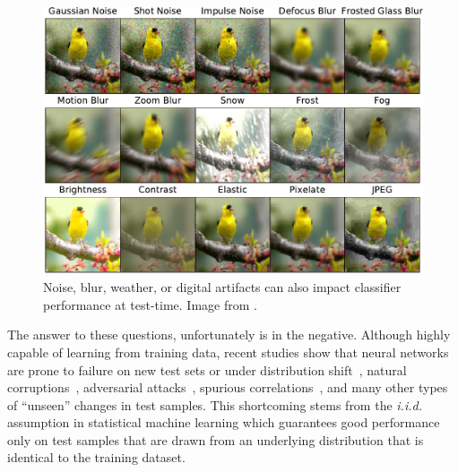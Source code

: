 \begin{figure}
    \centering
    \includegraphics[width=\linewidth]{figures/distorted.pdf}
    \caption{
    Noise, blur, weather, or digital artifacts can also impact classifier performance at test-time.
    Image from \citet{hendrycks2018benchmarking}.
    }
    \label{fig:cifar_c_introduction}
\end{figure}
The answer to these questions, unfortunately is in the negative.
Although highly capable of learning from training data, recent studies show that neural networks are prone to failure on new test sets or under distribution shift~\citep{taori2020measuring}, natural corruptions~\citep{hendrycks2018benchmarking}, adversarial attacks~\citep{goodfellow2014explaining}, spurious correlations~\citep{beery2018recognition}, and many other types of ``unseen'' changes in test samples.
This shortcoming stems from the \textit{i.i.d.} assumption in statistical machine learning which guarantees good performance only on test samples that are drawn from an underlying distribution that is identical to the training dataset.

